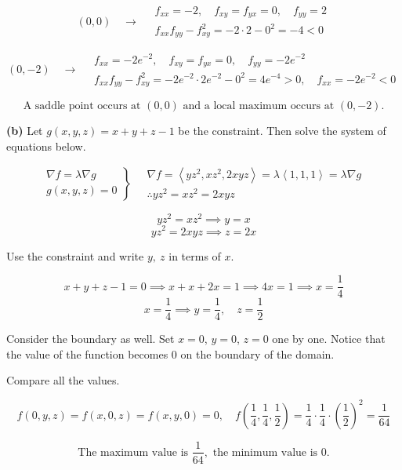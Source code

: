 \documentclass{article}
\begin{document}
\[(0,0)\quad\rightarrow\quad\begin{array}{l}f_{xx}=-2,\quad f_{xy}=f_{yx}=0,\quad f_{yy}=2\\[1em]
f_{xx}f_{yy}-f_{xy}^2=-2\cdot 2-0^2=-4<0\end{array}\]

\[(0,-2)\quad\rightarrow\quad\begin{array}{l}f_{xx}=-2{e}^{-2},\quad f_{xy}=f_{yx}=0,\quad f_{yy}=-2{e}^{-2}\\[1em]f_{xx}f_{yy}-f_{xy}^2=-2{e}^{-2}\cdot2{e}^{-2}-0^2=4{e}^{-4}>0,\quad f_{xx}=-2{e}^{-2}<0\end{array}\]

\[\boxed{\text{A saddle point occurs at } (0,0)\text{ and a local maximum occurs at } (0,-2).}\]

\textbf{(b)} Let $g(x,y,z)=x+y+z-1$ be the constraint. Then solve the system of equations below.

\[
\left.
\begin{array}{ll}
\displaystyle\nabla f =\lambda \nabla g \\
\displaystyle g(x,y,z) = 0
\end{array}
\right\}\quad
\begin{array}{ll}
\nabla f = \left\langle yz^2,xz^2,2xyz\right\rangle=\lambda\left\langle1,1,1\right\rangle = \lambda\nabla g\\\therefore yz^2=xz^2=2xyz
\end{array}
\]

\[yz^2=xz^2\implies y=x\]
\[yz^2=2xyz\implies z=2x\]

Use the constraint and write $y,\:z$ in terms of $x$.

\[x+y+z-1=0\implies x+x+2x=1\implies 4x=1\implies x=\frac14\]
\[x=\frac14\implies y=\frac14,\quad z=\frac12\]

Consider the boundary as well. Set $x=0$, $y=0$, $z=0$ one by one. Notice that the value of the function becomes $0$ on the boundary of the domain.

Compare all the values.

\[f(0,y,z)=f(x,0,z)=f(x,y,0)=0,\quad f\left(\frac14,\frac14,\frac12\right)=\frac14\cdot\frac14\cdot\left(\frac12\right)^2=\frac1{64}\]

\[\boxed{\text{The maximum value is }\frac1{64},\text{ the minimum value is }0.}\]

\vspace{1em}
\end{document}
